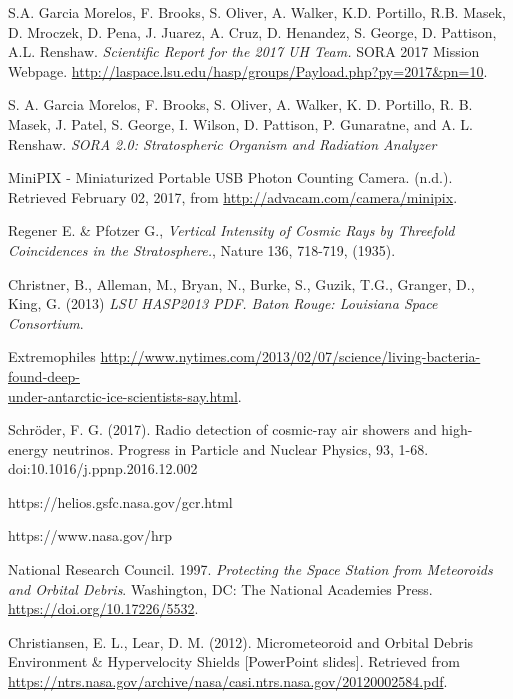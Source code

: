 \newpage

\begin{thebibliography}{9}
S.A. Garcia Morelos, F. Brooks, S. Oliver, A. Walker, K.D. Portillo, R.B. Masek, D. Mroczek, D. Pena, J. Juarez, A. Cruz, D. Henandez, S. George, D. Pattison, A.L. Renshaw. \textit{Scientific Report for the 2017 UH Team.} SORA 2017 Mission Webpage. \url{http://laspace.lsu.edu/hasp/groups/Payload.php?py=2017&pn=10}.

  S. A. Garcia Morelos, F. Brooks, S. Oliver, A. Walker, K. D. Portillo, R. B. Masek, J. Patel, S. George, I. Wilson, D. Pattison, P. Gunaratne, and A. L. Renshaw. \textit{SORA 2.0: Stratospheric Organism and Radiation Analyzer}

  MiniPIX - Miniaturized Portable USB Photon Counting Camera. (n.d.). Retrieved February 02, 2017, from \url{http://advacam.com/camera/minipix}.

 Regener E. \& Pfotzer G., \textit{Vertical Intensity of Cosmic Rays by Threefold Coincidences in the Stratosphere.}, Nature 136, 718-719, (1935). 
  
  Christner, B., Alleman, M., Bryan, N., Burke, S., Guzik, T.G., Granger, D., King, G. (2013) \textit{LSU HASP2013 PDF. Baton Rouge: Louisiana Space Consortium}.

  Extremophiles \href{http://www.nytimes.com/2013/02/07/science/living-bacteria-found-deep-under-antarctic-ice-scientists-say.html}{http://www.nytimes.com/2013/02/07/science/living-bacteria-found-deep-\\under-antarctic-ice-scientists-say.html}.

  Schröder, F. G. (2017). Radio detection of cosmic-ray air showers and high-energy neutrinos. Progress in Particle and Nuclear Physics, 93, 1-68. doi:10.1016/j.ppnp.2016.12.002

  https://helios.gsfc.nasa.gov/gcr.html

  https://www.nasa.gov/hrp

  National Research Council. 1997. \textit{Protecting the Space Station from Meteoroids and Orbital Debris}. Washington, DC: The National Academies Press. \url{https://doi.org/10.17226/5532}.

  Christiansen, E. L., Lear, D. M. (2012). Micrometeoroid and Orbital Debris Environment \& Hypervelocity Shields [PowerPoint slides]. Retrieved from \url{https://ntrs.nasa.gov/archive/nasa/casi.ntrs.nasa.gov/20120002584.pdf}.
  

\end{thebibliography}
